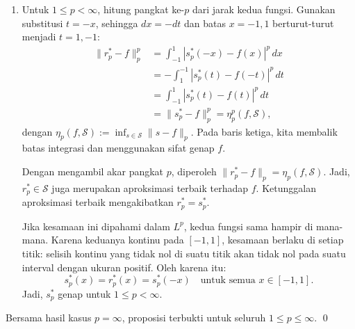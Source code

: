 \documentclass[aspectratio=169,11pt]{beamer}
\theoremstyle{definition}
\begin{document}
\begin{frame}[allowframebreaks=1]{\insertsection}{\insertsubsection}
\begin{enumerate}
          Jadi, $r_\infty^*\in\mathcal{S}$ juga mencapai jarak minimal terhadap $f$. Karena aproksimasi terbaik tunggal, harus berlaku $r_\infty^*=s_\infty^*$. Berdasarkan definisi refleksi:
          \begin{equation*}
            s_\infty^*(x)=r_\infty^*(x)=s_\infty^*(-x)
            \quad \text{untuk semua } x\in[-1,1].
          \end{equation*}
          Dengan demikian, $s_\infty^*$ genap.

    \item Untuk $1\leq p<\infty$, hitung pangkat ke-$p$ dari jarak kedua fungsi. Gunakan substitusi $t=-x$, sehingga $dx=-dt$ dan batas $x=-1,1$ berturut-turut menjadi $t=1,-1$:
          \begin{align*}
            \|r_p^*-f\|_p^p
             & =\int_{-1}^{1}|s_p^*(-x)-f(x)|^p\,dx      \\
             & =-\int_{1}^{-1}|s_p^*(t)-f(-t)|^p\,dt     \\
             & =\int_{-1}^{1}|s_p^*(t)-f(t)|^p\,dt       \\
             & =\|s_p^*-f\|_p^p=\eta_p^p(f,\mathcal{S}),
          \end{align*}
          dengan $\eta_p(f,\mathcal{S}):=\inf_{s\in\mathcal{S}}\|s-f\|_p$. Pada baris ketiga, kita membalik batas integrasi dan menggunakan sifat genap $f$.

          Dengan mengambil akar pangkat $p$, diperoleh $\|r_p^*-f\|_p=\eta_p(f,\mathcal{S})$. Jadi, $r_p^*\in\mathcal{S}$ juga merupakan aproksimasi terbaik terhadap $f$. Ketunggalan aproksimasi terbaik mengakibatkan $r_p^*=s_p^*$.

          Jika kesamaan ini dipahami dalam $L^p$, kedua fungsi sama hampir di mana-mana. Karena keduanya kontinu pada $[-1,1]$, kesamaan berlaku di setiap titik: selisih kontinu yang tidak nol di suatu titik akan tidak nol pada suatu interval dengan ukuran positif. Oleh karena itu:
          \begin{equation*}
            s_p^*(x)=r_p^*(x)=s_p^*(-x)
            \quad \text{untuk semua } x\in[-1,1].
          \end{equation*}
          Jadi, $s_p^*$ genap untuk $1\leq p<\infty$.
  \end{enumerate}

  Bersama hasil kasus $p=\infty$, proposisi terbukti untuk seluruh $1\leq p\leq\infty$. \qed
\end{frame}
\end{document}
